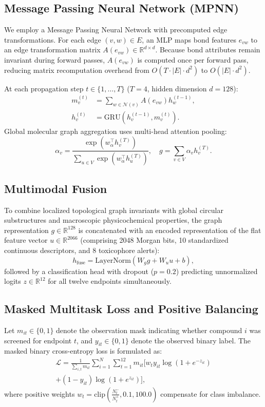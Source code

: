 \documentclass[conference]{IEEEtran}
\begin{document}
\subsection{Message Passing Neural Network (MPNN)}
We employ a Message Passing Neural Network with precomputed edge transformations. For each edge $(v, w) \in E$, an MLP maps bond features $e_{vw}$ to an edge transformation matrix $A(e_{vw}) \in \mathbb{R}^{d \times d}$. Because bond attributes remain invariant during forward passes, $A(e_{vw})$ is computed once per forward pass, reducing matrix recomputation overhead from $O(T \cdot |E| \cdot d^2)$ to $O(|E| \cdot d^2)$.

At each propagation step $t \in \{1, \dots, T\}$ ($T=4$, hidden dimension $d=128$):
\begin{align}
m_v^{(t)} &= \sum_{w \in \mathcal{N}(v)} A(e_{vw}) h_w^{(t-1)}, \\
h_v^{(t)} &= \mathrm{GRU}\left(h_v^{(t-1)}, m_v^{(t)}\right).
\end{align}
Global molecular graph aggregation uses multi-head attention pooling:
\begin{equation}
\alpha_v = \frac{\exp(w_\alpha^\top h_v^{(T)})}{\sum_{u \in V} \exp(w_\alpha^\top h_u^{(T)})}, \quad g = \sum_{v \in V} \alpha_v h_v^{(T)}.
\end{equation}

\subsection{Multimodal Fusion}
To combine localized topological graph invariants with global circular substructures and macroscopic physicochemical properties, the graph representation $g \in \mathbb{R}^{128}$ is concatenated with an encoded representation of the flat feature vector $u \in \mathbb{R}^{2066}$ (comprising 2048 Morgan bits, 10 standardized continuous descriptors, and 8 toxicophore alerts):
\begin{equation}
h_{\mathrm{fuse}} = \mathrm{LayerNorm}\left( W_g g + W_u u + b \right),
\end{equation}
followed by a classification head with dropout ($p=0.2$) predicting unnormalized logits $z \in \mathbb{R}^{12}$ for all twelve endpoints simultaneously.

\subsection{Masked Multitask Loss and Positive Balancing}
Let $m_{it} \in \{0, 1\}$ denote the observation mask indicating whether compound $i$ was screened for endpoint $t$, and $y_{it} \in \{0, 1\}$ denote the observed binary label. The masked binary cross-entropy loss is formulated as:
\begin{multline}
\mathcal{L} = \frac{1}{\sum_{i,t} m_{it}} \sum_{i=1}^N \sum_{t=1}^{12} m_{it} \big[ w_t y_{it} \log(1 + e^{-z_{it}}) \\
+ (1 - y_{it}) \log(1 + e^{z_{it}}) \big],
\end{multline}
where positive weights $w_t = \mathrm{clip}\left(\frac{N_t^-}{N_t^+}, 0.1, 100.0\right)$ compensate for class imbalance.
\end{document}
